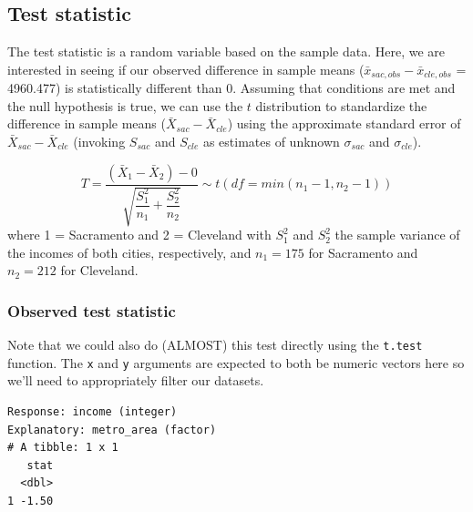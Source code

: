 \documentclass[12pt,]{krantz}
\makeatletter
\newenvironment{Shaded}{\begin{snugshade}}{\end{snugshade}}
\newcommand{\KeywordTok}[1]{\textcolor[rgb]{0.27,0.27,0.27}{\textbf{#1}}}
\newcommand{\DataTypeTok}[1]{\textcolor[rgb]{0.27,0.27,0.27}{#1}}
\newcommand{\StringTok}[1]{\textcolor[rgb]{0.5,0.5,0.5}{#1}}
\newcommand{\OperatorTok}[1]{\textcolor[rgb]{0.43,0.43,0.43}{\textbf{#1}}}
\newcommand{\NormalTok}[1]{#1}
\newenvironment{kframe}{%
\medskip{}
\setlength{\fboxsep}{.8em}
 \def\at@end@of@kframe{}%
 \ifinner\ifhmode%
  \def\at@end@of@kframe{\end{minipage}}%
  \begin{minipage}{\columnwidth}%
 \fi\fi%
 \def\FrameCommand##1{\hskip\@totalleftmargin \hskip-\fboxsep
 \colorbox{shadecolor}{##1}\hskip-\fboxsep
     \hskip-\linewidth \hskip-\@totalleftmargin \hskip\columnwidth}%
 \MakeFramed {\advance\hsize-\width
   \@totalleftmargin\z@ \linewidth\hsize
   \@setminipage}}%
 {\par\unskip\endMakeFramed%
 \at@end@of@kframe}
\renewenvironment{Shaded}{\begin{kframe}}{\end{kframe}}
\theoremstyle{definition}
\theoremstyle{definition}
\theoremstyle{definition}
\theoremstyle{remark}
\makeatother
\begin{document}
\subsection{Test statistic}\label{test-statistic-3}

The test statistic is a random variable based on the sample data. Here,
we are interested in seeing if our observed difference in sample means
(\(\bar{x}_{sac, obs} - \bar{x}_{cle, obs}\) = 4960.477) is
statistically different than 0. Assuming that conditions are met and the
null hypothesis is true, we can use the \(t\) distribution to
standardize the difference in sample means
(\(\bar{X}_{sac} - \bar{X}_{cle}\)) using the approximate standard error
of \(\bar{X}_{sac} - \bar{X}_{cle}\) (invoking \(S_{sac}\) and
\(S_{cle}\) as estimates of unknown \(\sigma_{sac}\) and
\(\sigma_{cle}\)).

\[ T =\dfrac{ (\bar{X}_1 - \bar{X}_2) - 0}{ \sqrt{\dfrac{S_1^2}{n_1} + \dfrac{S_2^2}{n_2}}  } \sim t (df = min(n_1 - 1, n_2 - 1)) \]
where 1 = Sacramento and 2 = Cleveland with \(S_1^2\) and \(S_2^2\) the
sample variance of the incomes of both cities, respectively, and
\(n_1 = 175\) for Sacramento and \(n_2 = 212\) for Cleveland.

\subsubsection*{Observed test
statistic}\label{observed-test-statistic-3}


Note that we could also do (ALMOST) this test directly using the
\texttt{t.test} function. The \texttt{x} and \texttt{y} arguments are
expected to both be numeric vectors here so we'll need to appropriately
filter our datasets.

\begin{Shaded}
\end{Shaded}

\begin{verbatim}
Response: income (integer)
Explanatory: metro_area (factor)
# A tibble: 1 x 1
   stat
  <dbl>
1 -1.50
\end{verbatim}
\end{document}
